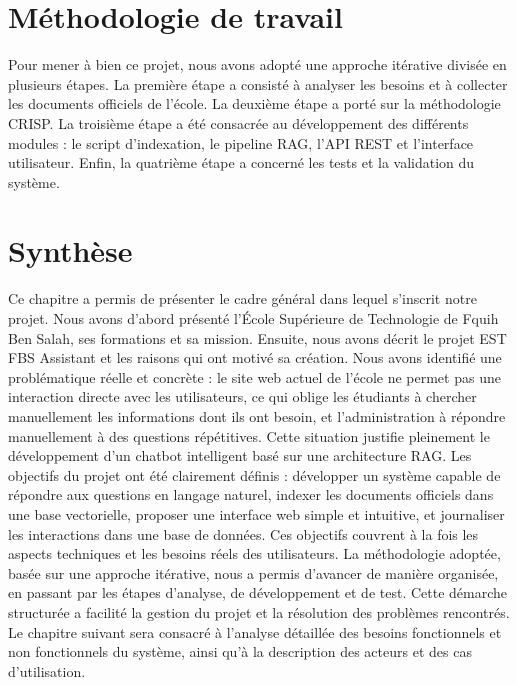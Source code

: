 \documentclass[12pt, a4paper, twoside]{report}
\begin{document}
\section{Méthodologie de travail}
Pour mener à bien ce projet, nous avons adopté une approche itérative divisée en plusieurs étapes. La première étape a consisté à analyser les besoins et à collecter les documents officiels de l'école. La deuxième étape a porté sur la méthodologie CRISP. La troisième étape a été consacrée au développement des différents modules : le script d'indexation, le pipeline RAG, l'API REST et l'interface utilisateur. Enfin, la quatrième étape a concerné les tests et la validation du système.
\section{Synthèse}
Ce chapitre a permis de présenter le cadre général dans lequel s'inscrit notre projet. Nous avons d'abord présenté l'École Supérieure de Technologie de Fquih Ben Salah, ses formations et sa mission. Ensuite, nous avons décrit le projet EST FBS Assistant et les \newline  raisons qui ont motivé sa création.
Nous avons identifié une problématique réelle et concrète : le site web actuel de l'école ne permet pas une interaction directe avec les utilisateurs, ce qui oblige les étudiants à chercher manuellement les informations dont ils ont besoin, et l'administration à répondre manuellement à des questions répétitives. Cette situation justifie pleinement le développement d'un chatbot intelligent basé sur une \newline  architecture RAG.
Les objectifs du projet ont été clairement définis : développer un \newline  système capable de répondre aux questions en langage naturel, indexer les documents officiels dans une base vectorielle, proposer une interface web simple et intuitive, et \newline  journaliser les interactions dans une base de données. Ces objectifs couvrent à la fois les aspects techniques et les besoins réels des utilisateurs.
La méthodologie adoptée, basée sur une approche itérative, nous a permis d'avancer de manière organisée, en passant par les étapes d'analyse, de développement et de test. Cette démarche structurée a facilité la gestion du projet et la résolution des problèmes rencontrés.
Le chapitre suivant sera consacré à l'analyse détaillée des besoins fonctionnels et non fonctionnels du système, ainsi qu'à la description des acteurs et des cas d'utilisation.
\end{document}
